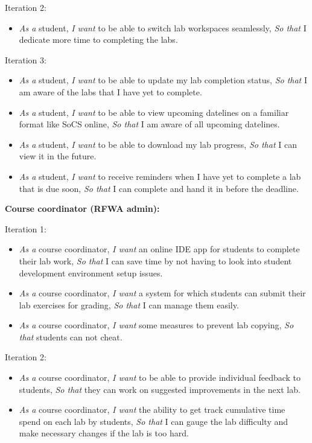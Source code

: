 \documentclass{l4proj}
\begin{document}
Iteration 2:

\begin{itemize}
    \item
    \emph{As a} student, \emph{I want} to be able to switch lab workspaces seamlessly, \emph{So that} I dedicate more time to completing the labs.
\end{itemize}

Iteration 3:

\begin{itemize}
    \item
    \emph{As a} student, \emph{I want} to be able to update my lab completion status, \emph{So that} I am aware of the labs that I have yet to complete.
    \item
    \emph{As a} student, \emph{I want} to be able to view upcoming datelines on a familiar format like SoCS online, \emph{So that} I am aware of all upcoming datelines.
    \item
    \emph{As a} student, \emph{I want} to be able to download my lab progress, \emph{So that} I can view it in the future.
    \item
    \emph{As a} student, \emph{I want} to receive reminders when I have yet to complete a lab that is due soon, \emph{So that} I can complete and hand it in before the deadline.
\end{itemize}

\textbf{Course coordinator (RFWA admin):}

Iteration 1:

\begin{itemize}
    \item
    \emph{As a} course coordinator, \emph{I want} an online IDE app for students to complete their lab work, \emph{So that} I can save time by not having to look into student development environment setup issues.
    \item
    \emph{As a} course coordinator, \emph{I want} a system for which students can submit their lab exercises for grading, \emph{So that} I can manage them easily.
    \item
    \emph{As a} course coordinator, \emph{I want} some measures to prevent lab copying, \emph{So that} students can not cheat.
\end{itemize}

Iteration 2:

\begin{itemize}
    \item
    \emph{As a} course coordinator, \emph{I want} to be able to provide individual feedback to students, \emph{So that} they can work on suggested improvements in the next lab.
    \item
    \emph{As a} course coordinator, \emph{I want} the ability to get track cumulative time spend on each lab by students, \emph{So that} I can gauge the lab difficulty and make necessary changes if the lab is too hard.
\end{itemize}
\end{document}
